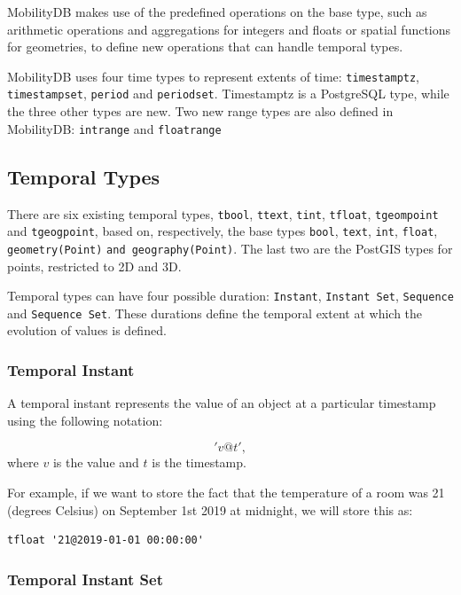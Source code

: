 MobilityDB makes use of the predefined operations on the base type, such as arithmetic operations and aggregations for integers and floats or spatial functions for geometries, to define new operations that can handle temporal types.

MobilityDB uses four time types to represent extents of time: \lstinline{timestamptz}, \lstinline{timestampset}, \lstinline{period} and \lstinline{periodset}. Timestamptz is a PostgreSQL type, while the three other types are new. Two new range types are also defined in MobilityDB: \lstinline{intrange} and \lstinline{floatrange}

\subsection{Temporal Types}
\label{section:mobilitydb_ttypes}

There are six existing temporal types, \lstinline{tbool}, \lstinline{ttext}, \lstinline{tint}, \lstinline{tfloat}, \lstinline{tgeompoint} and \lstinline{tgeogpoint}, based on, respectively, the base types \lstinline{bool}, \lstinline{text}, \lstinline{int}, \lstinline{float}, \lstinline{geometry(Point)} \lstinline{and geography(Point)}. The last two are the PostGIS types for points, restricted to 2D and 3D.

Temporal types can have four possible duration: \lstinline{Instant}, \lstinline{Instant Set}, \lstinline{Sequence} and \lstinline{Sequence Set}. These durations define the temporal extent at which the evolution of values is defined.

\subsubsection{Temporal Instant}
\label{section:mobilitydb_inst}

A temporal instant represents the value of an object at a particular timestamp using the following notation:

\[
    'v@t',
\]
where \(v\) is the value and \(t\) is the timestamp.

For example, if we want to store the fact that the temperature of a room was 21 (degrees Celsius) on September 1st 2019 at midnight, we will store this as:

\begin{lstlisting}
tfloat '21@2019-01-01 00:00:00'
\end{lstlisting}

\subsubsection{Temporal Instant Set}
\label{section:mobilitydb_i}

